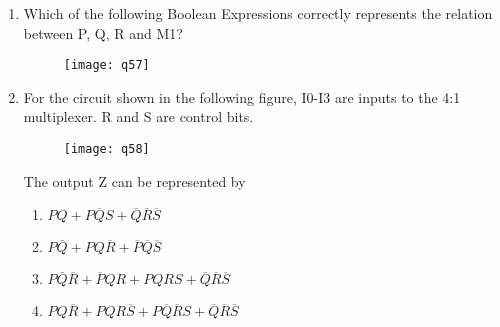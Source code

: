 \documentclass[a4paper, 11pt]{article}
\begin{document}
\begin{enumerate}
    \hfill{}

    \item Which of the following Boolean Expressions correctly represents the relation between P, Q, R and M1?
    \begin{figure}[H]
        \centering
        \texttt{[image: q57]}
        \caption*{}
        \label{fig:q57}
    \end{figure}
    \begin{enumerate}
    \end{enumerate}
    
    \hfill{}
    
    \item For the circuit shown in the following figure, I0-I3 are inputs to the 4:1 multiplexer. R  and S are control bits.
    \begin{figure}[H]
        \centering
        \texttt{[image: q58]}
        \caption*{}
        \label{fig:q58}
    \end{figure}
    The output Z can be represented by
    \begin{enumerate}
        \item $PQ+P\overline{Q}S+\overline{Q}\overline{R}\overline{S}$
        \item $P\overline{Q}+PQ\overline{R}+\overline{P}\overline{Q}\overline{S}$
        \item $P\overline{Q}\overline{R}+\overline{P}QR+PQRS+\overline{Q}\overline{R}\overline{S}$
        \item $PQ\overline{R}+PQR\overline{S}+P\overline{Q}\overline{R}S+\overline{Q}\overline{R}\overline{S}$
    \end{enumerate}
    
    \hfill{}
    

\end{enumerate}
\end{document}
